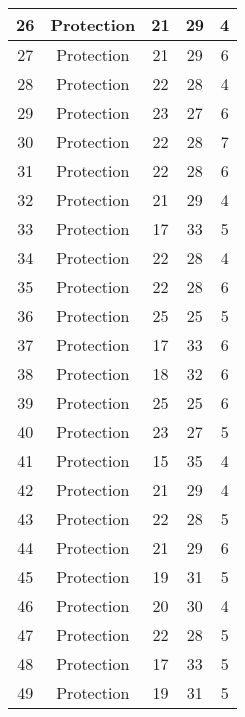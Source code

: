 \documentclass[results.tex]{subfiles}
\begin{document}
\begin{center}
\begin{tabular}{| c || c | c | c | c |}
    \hline
    26 & Protection & 21 & 29 & 4 \\ 
    \hline
    27 & Protection & 21 & 29 & 6 \\ 
    \hline
    28 & Protection & 22 & 28 & 4 \\ 
    \hline
    29 & Protection & 23 & 27 & 6 \\ 
    \hline
    30 & Protection & 22 & 28 & 7 \\ 
    \hline
    31 & Protection & 22 & 28 & 6 \\ 
    \hline
    32 & Protection & 21 & 29 & 4 \\ 
    \hline
    33 & Protection & 17 & 33 & 5 \\ 
    \hline
    34 & Protection & 22 & 28 & 4 \\ 
    \hline
    35 & Protection & 22 & 28 & 6 \\ 
    \hline
    36 & Protection & 25 & 25 & 5 \\ 
    \hline
    37 & Protection & 17 & 33 & 6 \\ 
    \hline
    38 & Protection & 18 & 32 & 6 \\ 
    \hline
    39 & Protection & 25 & 25 & 6 \\ 
    \hline
    40 & Protection & 23 & 27 & 5 \\ 
    \hline
    41 & Protection & 15 & 35 & 4 \\ 
    \hline
    42 & Protection & 21 & 29 & 4 \\ 
    \hline
    43 & Protection & 22 & 28 & 5 \\ 
    \hline
    44 & Protection & 21 & 29 & 6 \\ 
    \hline
    45 & Protection & 19 & 31 & 5 \\ 
    \hline
    46 & Protection & 20 & 30 & 4 \\ 
    \hline
    47 & Protection & 22 & 28 & 5 \\ 
    \hline
    48 & Protection & 17 & 33 & 5 \\ 
    \hline
    49 & Protection & 19 & 31 & 5 \\ 
    \hline   \end{tabular}
\end{center}
\end{document}
